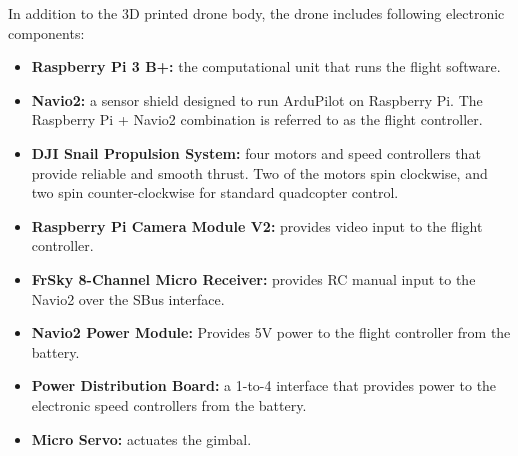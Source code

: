 In addition to the 3D printed drone body, the drone includes following electronic components:
\begin{itemize}
    \item \textbf{Raspberry Pi 3 B+:} the computational unit that runs the flight software.
    \item \textbf{Navio2:} a sensor shield designed to run ArduPilot on Raspberry Pi.
            The Raspberry Pi + Navio2 combination is referred to as the flight controller.
    \item \textbf{DJI Snail Propulsion System:} four motors and speed controllers that provide reliable and smooth thrust.
            Two of the motors spin clockwise, and two spin counter-clockwise for standard quadcopter control.
    \item \textbf{Raspberry Pi Camera Module V2:} provides video input to the flight controller.
    \item \textbf{FrSky 8-Channel Micro Receiver:} provides RC manual input to the Navio2 over the SBus interface.
    \item \textbf{Navio2 Power Module:} Provides 5V power to the flight controller from the battery.
    \item \textbf{Power Distribution Board:} a 1-to-4 interface that provides power to the electronic speed controllers from the battery.
    \item \textbf{Micro Servo:} actuates the gimbal.
\end{itemize}